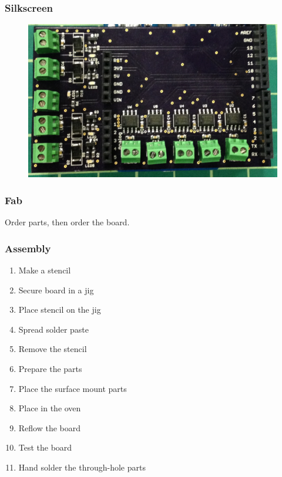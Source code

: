 \documentclass{beamer}
\begin{document}
\begin{frame}
\frametitle{Silkscreen}
\begin{figure}
\includegraphics[width=1\linewidth]{silkscreen.png}
\end{figure}
\end{frame}


\begin{frame}
\frametitle{Fab}
Order parts, then order the board. 
\end{frame}


\begin{frame}
\frametitle{Assembly}
\begin{enumerate}
\item Make a stencil
\item Secure board in a jig
\item Place stencil on the jig
\item Spread solder paste
\item Remove the stencil
\item Prepare the parts
\item Place the surface mount parts
\item Place in the oven
\item Reflow the board
\item Test the board
\item Hand solder the through-hole parts
\end{enumerate}
\end{frame}

\end{document}
